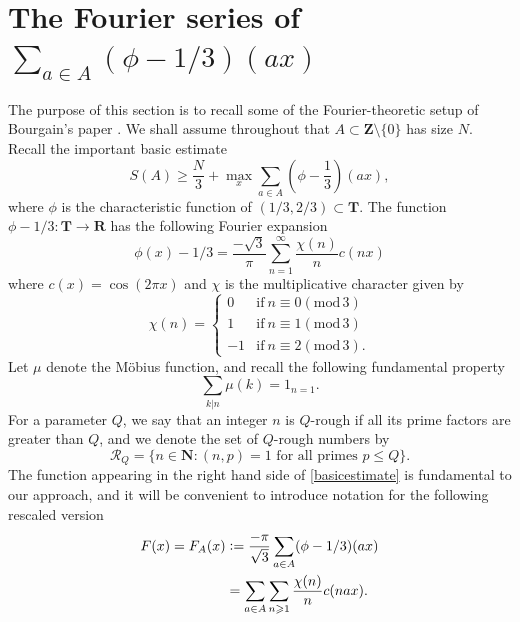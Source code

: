 \documentclass[11pt, reqno]{amsart}
\newcommand{\md}[1]{\ensuremath{(\mbox{mod}\, #1)}}
\begin{document}
\section{The Fourier series of $\sum_{a\in A}\left(\phi-1/3\right)(ax)$}
The purpose of this section is to recall some of the Fourier-theoretic setup of Bourgain's paper \cite{bourgain}. We shall assume throughout that $A\subset\mathbf{Z}\setminus\{0\}$ has size $N$. Recall the important basic estimate
\begin{equation}\label{basicestimate}
    S(A)\geqslant \frac{N}{3}+\max_{x}\sum_{a\in A}\left(\phi-\frac{1}{3}\right)(ax),
\end{equation}
where $\phi$ is the characteristic function of $(1/3,2/3)\subset\mathbf{T}$. The function $\phi-1/3:\mathbf{T}\to \mathbf{R}$ has the following Fourier expansion
\begin{equation*}
    \phi(x)-1/3=\frac{-\sqrt{3}}{\pi}\sum_{n=1}^\infty\frac{\chi(n)}{n}c ( nx)
\end{equation*}
where $c(x)=\cos(2\pi x)$ and $\chi$ is the multiplicative character given by
\begin{equation*}
    \chi(n)=\begin{cases}
        0 & \text{if}\ n\equiv 0 \md 3 \\ 
        1 & \text{if}\ n\equiv 1 \md 3 \\
        -1 & \text{if}\ n\equiv 2 \md 3.
    \end{cases}
\end{equation*}
Let $\mu$ denote the M\"obius function, and recall the following fundamental property
\begin{equation*}
    \sum_{k|n}\mu(k)= 1_{n=1}.
\end{equation*} 
For a parameter $Q$, we say that an integer $n$ is $Q$-rough if all its prime factors are greater than $Q$, and we denote the set of $Q$-rough numbers by
\begin{equation*}
    \mathcal{R}_Q=\{n\in \mathbf{N}: (n,p)=1 \text{ for all primes }p\leqslant Q\}.
\end{equation*}
The function appearing in the right hand side of \eqref{basicestimate} is fundamental to our approach, and it will be convenient to introduce notation for the following rescaled version
\begin{align*}
    F(x)=F_A(x)&\vcentcolon=\frac{-\pi}{\sqrt{3}}\sum_{a\in A}(\phi-1/3)(ax)\\
    &=\sum_{a\in A}\sum_{n\geqslant 1}\frac{\chi(n)}{n}c (nax).
\end{align*}
\end{document}
